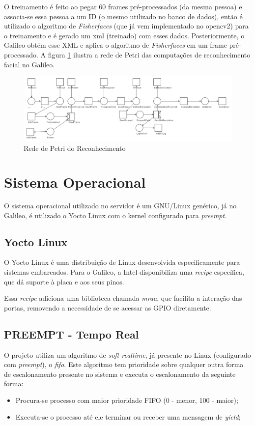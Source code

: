 \documentclass[12pt]{article}
\begin{document}
     O treinamento é feito ao pegar 60 frames pré-processados (da mesma pessoa)
     e associa-se essa pessoa a um ID (o mesmo utilizado no banco de dados),
     então é utilizado o algoritmo de \textit{Fisherfaces} (que já vem
     implementado no opencv2) para o treinamento e é gerado um xml (treinado)
     com esses dados. Posteriormente, o Galileo obtém esse XML e aplica o
     algoritmo de \textit{Fisherfaces} em um frame pré-processado. A figura
     \ref{fig:petri-reconhecimento} ilustra a rede de Petri das computações
     de reconhecimento facial no Galileo.
     
     \begin{figure}[ht]
		\centering
		\includegraphics[width=1\textwidth]{petri-reconhecimento.png}
		\caption{Rede de Petri do Reconhecimento}
		\label{fig:petri-reconhecimento}
	\end{figure}

\section{Sistema Operacional}
    O sistema operacional utilizado no servidor é um GNU/Linux genérico, já no
    Galileo, é utilizado o Yocto Linux com o kernel configurado para
    \textit{preempt}.

\subsection{Yocto Linux}
    O Yocto Linux é uma distribuição de Linux desenvolvida especificamente para
    sistemas embarcados. Para o Galileo, a Intel disponibiliza uma
     \textit{recipe} específica, que dá suporte à placa e aos seus pinos.

    Essa \textit{recipe} adiciona uma biblioteca chamada \textit{mraa},
    que facilita a interação das portas, removendo a necessidade de se acessar
    as GPIO diretamente.

\subsection{PREEMPT - Tempo Real}
    O projeto utiliza um algoritmo de \textit{soft-realtime}, já presente no
    Linux (configurado com \textit{preempt}), o \textit{fifo}. Este algoritmo tem
    prioridade sobre qualquer outra forma de escalonamento presente no sistema
    e executa o escalonamento da seguinte forma:
    \begin{itemize}
        \item Procura-se processo com maior prioridade FIFO (0 - menor, 100 -
        maior);
        \item Executa-se o processo até ele terminar ou receber uma mensagem de
        \textit{yield};
    \end{itemize}
\end{document}
